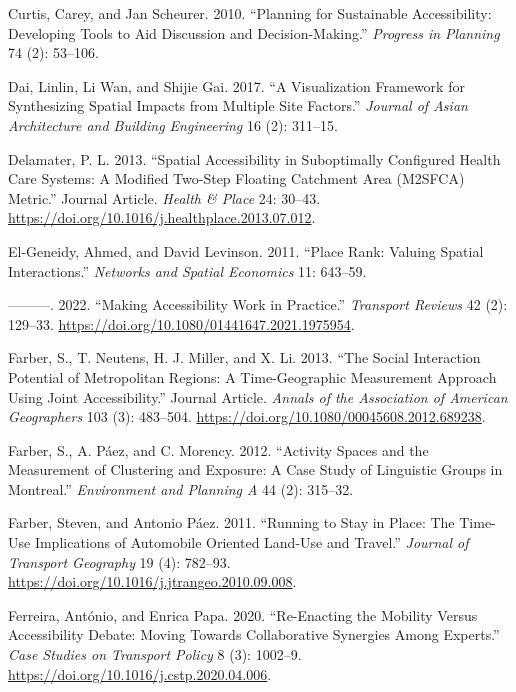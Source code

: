\documentclass[
]{article}
\newlength{\cslhangindent}
\newenvironment{CSLReferences}[2] %
 {\begin{list}{}{%
  \setlength{\itemindent}{0pt}
  \setlength{\leftmargin}{0pt}
  \setlength{\parsep}{0pt}
  \ifodd #1
   \setlength{\leftmargin}{\cslhangindent}
   \setlength{\itemindent}{-1\cslhangindent}
  \fi
  \setlength{\itemsep}{#2\baselineskip}}}
 {\end{list}}
\begin{document}
\begin{CSLReferences}{1}{0}
Curtis, Carey, and Jan Scheurer. 2010. {``Planning for Sustainable
Accessibility: Developing Tools to Aid Discussion and
Decision-Making.''} \emph{Progress in Planning} 74 (2): 53--106.

Dai, Linlin, Li Wan, and Shijie Gai. 2017. {``A Visualization Framework
for Synthesizing Spatial Impacts from Multiple Site Factors.''}
\emph{Journal of Asian Architecture and Building Engineering} 16 (2):
311--15.

Delamater, P. L. 2013. {``Spatial Accessibility in Suboptimally
Configured Health Care Systems: A Modified Two-Step Floating Catchment
Area (M2SFCA) Metric.''} Journal Article. \emph{Health \& Place} 24:
30--43. \url{https://doi.org/10.1016/j.healthplace.2013.07.012}.

El-Geneidy, Ahmed, and David Levinson. 2011. {``Place Rank: Valuing
Spatial Interactions.''} \emph{Networks and Spatial Economics} 11:
643--59.

---------. 2022. {``Making Accessibility Work in Practice.''}
\emph{Transport Reviews} 42 (2): 129--33.
\url{https://doi.org/10.1080/01441647.2021.1975954}.

Farber, S., T. Neutens, H. J. Miller, and X. Li. 2013. {``The Social
Interaction Potential of Metropolitan Regions: A Time-Geographic
Measurement Approach Using Joint Accessibility.''} Journal Article.
\emph{Annals of the Association of American Geographers} 103 (3):
483--504. \url{https://doi.org/10.1080/00045608.2012.689238}.

Farber, S., A. Páez, and C. Morency. 2012. {``Activity Spaces and the
Measurement of Clustering and Exposure: A Case Study of Linguistic
Groups in {Montreal}.''} \emph{Environment and Planning A} 44 (2):
315--32.

Farber, Steven, and Antonio Páez. 2011. {``Running to Stay in Place: The
Time-Use Implications of Automobile Oriented Land-Use and Travel.''}
\emph{Journal of Transport Geography} 19 (4): 782--93.
\url{https://doi.org/10.1016/j.jtrangeo.2010.09.008}.

Ferreira, António, and Enrica Papa. 2020. {``Re-Enacting the Mobility
Versus Accessibility Debate: Moving Towards Collaborative Synergies
Among Experts.''} \emph{Case Studies on Transport Policy} 8 (3):
1002--9. \url{https://doi.org/10.1016/j.cstp.2020.04.006}.


\end{CSLReferences}
\end{document}
